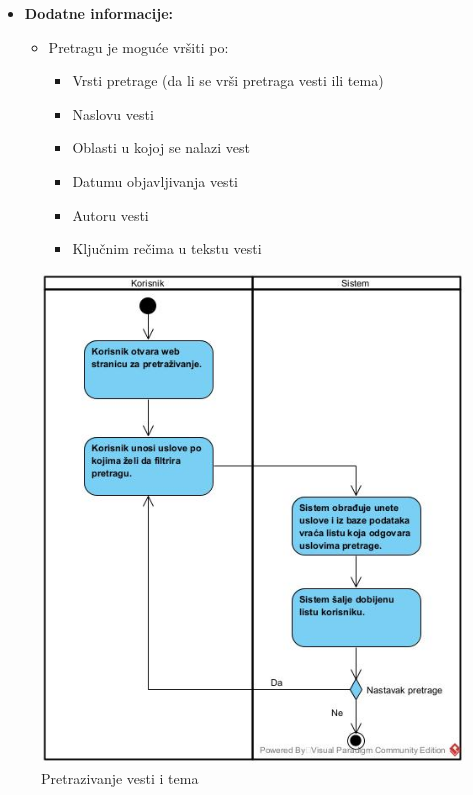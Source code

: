 \documentclass{article}
\begin{document}
\begin{itemize}
\begin{itemize}
		\end{itemize}
	\item \textbf{Dodatne informacije:}
        \begin{itemize}
            \item Pretragu je moguće vršiti po:
                \begin{itemize}
                    \item Vrsti pretrage (da li se vrši pretraga vesti ili tema)
                    \item Naslovu vesti
                    \item Oblasti u kojoj se nalazi vest
                    \item Datumu objavljivanja vesti
                    \item Autoru vesti
                    \item Ključnim rečima u tekstu vesti
                \end{itemize}
        \end{itemize}
\end{itemize}

\begin{figure}[htbp!]
    \centering
    \includegraphics[scale=0.7]{Pretrazivanje_vesti_i_tema.jpg}
    \caption{Pretrazivanje vesti i tema}
    \label{slk:dtp}
\end{figure}
\end{document}
